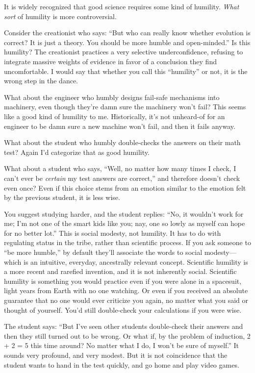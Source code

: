 
{
 It is widely recognized that good science requires some kind of
humility. \textit{What sort} of humility is more controversial. }

{
 Consider the creationist who says: ``But who can
really know whether evolution is correct? It is just a theory. You
should be more humble and open-minded.'' Is this
humility? The creationist practices a very selective underconfidence,
refusing to integrate massive weights of evidence in favor of a
conclusion they find uncomfortable. I would say that whether you call
this ``humility'' or not, it is the
wrong step in the dance.}

{
 What about the engineer who humbly designs fail-safe mechanisms
into machinery, even though they're damn sure the
machinery won't fail? This seems like a good kind of
humility to me. Historically, it's not unheard-of for
an engineer to be damn sure a new machine won't fail,
and then it fails anyway.}

{
 What about the student who humbly double-checks the answers on
their math test? Again I'd categorize that as good
humility.}

{
 What about a student who says, ``Well, no matter
how many times I check, I can't ever be
\textit{certain} my test answers are correct,'' and
therefore doesn't check even once? Even if this choice
stems from an emotion similar to the emotion felt by the previous
student, it is less wise.}

{
 You suggest studying harder, and the student replies:
``No, it wouldn't work for me;
I'm not one of the smart kids like you; nay, one so
lowly as myself can hope for no better lot.'' This is
social modesty, not humility. It has to do with regulating status in
the tribe, rather than scientific process. If you ask someone to
``be more humble,'' by default
they'll associate the words to social modesty---which
is an intuitive, everyday, ancestrally relevant concept. Scientific
humility is a more recent and rarefied invention, and it is not
inherently social. Scientific humility is something you would practice
even if you were alone in a spacesuit, light years from Earth with no
one watching. Or even if you received an absolute guarantee that no one
would ever criticize you again, no matter what you said or thought of
yourself. You'd still double-check your calculations if
you were wise.}

{
 The student says: ``But I've seen
other students double-check their answers and then they still turned
out to be wrong. Or what if, by the problem of induction, 2 + 2 = 5
this time around? No matter what I do, I won't be sure
of myself.'' It sounds very profound, and very
modest. But it is not coincidence that the student wants to hand in the
test quickly, and go home and play video games.}

